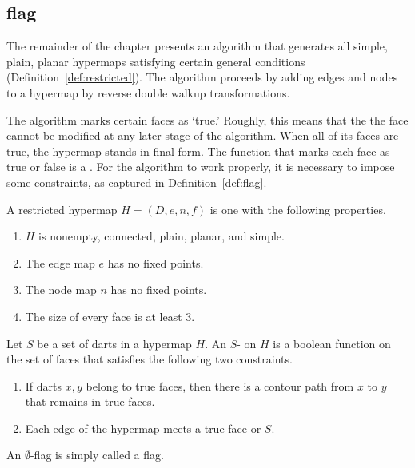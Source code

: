 \subsection{flag}
%

The remainder of the chapter presents an algorithm that generates all
simple, plain, planar hypermaps satisfying certain general conditions
(Definition~\ref{def:restricted}).  The algorithm proceeds by adding
edges and nodes to a hypermap by reverse double walkup
transformations.

The algorithm  marks certain faces as `true.'
Roughly, this  means that the the face cannot be modified
at any later stage of the algorithm.   When all of its faces
are true, the hypermap stands in final form.
The function that marks each face as true or false is a
.  For the algorithm to work properly, it is necessary
to impose some constraints, as captured in Definition~\ref{def:flag}.
%

\begin{definition}[restricted]\label{def:restricted}
A restricted hypermap $H = (D,e,n,f)$ is one with the following
properties.
\begin{enumerate}
\item $H$ is nonempty, connected, plain, planar, and simple.
\item The edge map $e$ has no fixed points.
\item The node map $n$ has no fixed points.
\item The size of every face is at least $3$.
\end{enumerate}
%
%
\end{definition}

\begin{definition}[flag]\label{def:flag} 
Let $S$ be a set of darts in a hypermap $H$.  An
$S$- on $H$ is a boolean function on the set of faces that satisfies
the following two constraints. 
\begin{enumerate}
\item If darts $x,y$ belong to true faces,
then there is a contour path from $x$ to $y$ that remains
in true faces.
\item Each edge of the hypermap meets a true face or $S$.
\end{enumerate}
An $\emptyset$-flag is simply called a flag.
%
%
\end{definition}


